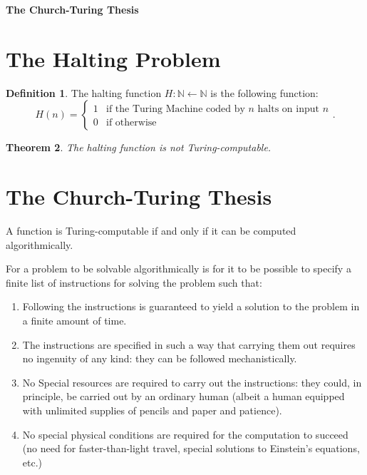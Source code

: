 \documentclass[12pt]{article}
\newtheorem{theo}{Theorem}[section]
\theoremstyle{definition}
\newtheorem{defin}[theo]{Definition}
\begin{document}


\begin{center}
{\Large \bf The Church-Turing Thesis}
\end{center}

\smallskip

\section{The Halting Problem}

\begin{defin}
The halting function $H: \mathbb{N} \leftarrow \mathbb{N}$ is the following function:
\begin{equation}
H(n) = \begin{cases} 1 &\mbox{if the Turing Machine coded by $n$ halts on input $n$} \\ 
0 & \mbox{if otherwise} \end{cases}.
\end{equation}
\end{defin}

\begin{theo}
The halting function is not Turing-computable.
\end{theo}

\section{The Church-Turing Thesis}

\begin{description}[style=unboxed,leftmargin=0cm]
\item[Church-Turing Thesis] A function is Turing-computable if and only if it can be computed algorithmically.
\end{description}

For a problem to be solvable algorithmically is for it to be possible to specify a finite list of instructions for solving the problem such that:
\begin{enumerate}
\item Following the instructions is guaranteed to yield a solution to the problem in a finite amount of time.
\item The instructions are specified in such a way that carrying them out requires no ingenuity of any kind: they can be followed mechanistically.
\item No Special resources are required to carry out the instructions: they could, in principle, be carried out by an ordinary human (albeit a human equipped with unlimited supplies of pencils and paper and patience).
\item No special physical conditions are required for the computation to succeed (no need for faster-than-light travel, special solutions to Einstein's equations, etc.)
\end{enumerate}
\end{document}

